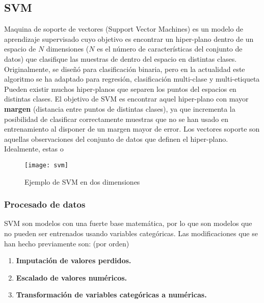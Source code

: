 \subsection{SVM}
\label{sec:svm}
Maquina de soporte de vectores (Support Vector Machines) es un modelo de aprendizaje supervisado cuyo objetivo es encontrar un hiper-plano dentro de un espacio de  $N$ dimensiones ($N$ es el número de características del conjunto de datos) que clasifique las muestras de dentro del espacio en distintas clases.  Originalmente, se diseñó para clasificación binaria, pero en la actualidad este algoritmo se ha adaptado para regresión, clasificación multi-clase y  multi-etiqueta\\
\linebreak
Pueden existir muchos hiper-planos que separen los puntos del espacios en distintas clases. El objetivo de SVM es encontrar aquel hiper-plano con mayor \textbf{margen} (distancia entre puntos de distintas clases),  ya que incrementa la posibilidad de clasificar correctamente muestras que no se han usado en entrenamiento al disponer de un margen mayor de error. Los vectores soporte son aquellas observaciones del conjunto de datos que definen el hiper-plano. Idealmente, estas o\\
\begin{figure}[H]
	\centering
	\texttt{[image: svm]}
	\caption{Ejemplo de SVM en dos dimensiones}
	\label{fig:svm}
\end{figure}
\subsubsection*{Procesado de datos}
SVM son modelos con una fuerte base matemática, por lo que son modelos que no pueden ser entrenados usando variables categóricas.
Las modificaciones que se han hecho previamente son: (por orden)
\begin{enumerate}
	\item \textbf{Imputación de valores perdidos.}
	\item \textbf{Escalado de valores numéricos.}
	\item \textbf{Transformación de variables categóricas a numéricas.}
\end{enumerate}
